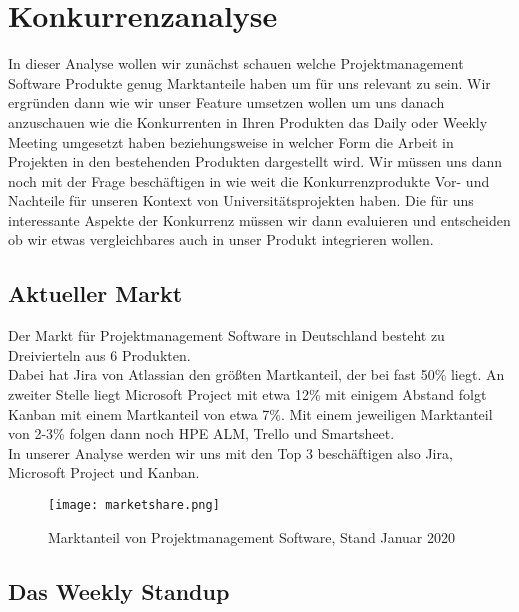 \chapter{Konkurrenzanalyse}

In dieser Analyse wollen wir zunächst schauen welche Projektmanagement Software Produkte genug Marktanteile haben um für uns relevant zu sein. Wir ergründen dann wie wir unser Feature umsetzen wollen um uns danach anzuschauen wie die Konkurrenten in Ihren Produkten das Daily oder Weekly Meeting umgesetzt haben beziehungsweise in welcher Form die Arbeit in Projekten in den bestehenden Produkten dargestellt wird. Wir müssen uns dann noch mit der Frage beschäftigen in wie weit die Konkurrenzprodukte Vor- und Nachteile für unseren Kontext von Universitätsprojekten haben. Die für uns interessante Aspekte der Konkurrenz müssen wir dann evaluieren und entscheiden ob wir etwas vergleichbares auch in unser Produkt integrieren wollen.

\section{Aktueller Markt}

Der Markt für Projektmanagement Software in Deutschland besteht zu Dreivierteln aus 6 Produkten. \\
Dabei hat Jira von Atlassian den größten Martkanteil, der bei fast 50\% liegt. An zweiter Stelle liegt Microsoft Project mit etwa 12\% mit einigem Abstand folgt Kanban mit einem Martkanteil von etwa 7\%. Mit einem jeweiligen Marktanteil von 2-3\% folgen dann noch HPE ALM, Trello und Smartsheet. \\
In unserer Analyse werden wir uns mit den Top 3 beschäftigen also Jira, Microsoft Project und Kanban. 

\begin{figure}[H]
	\centering
	\texttt{[image: marketshare.png]}
    \caption{Marktanteil von Projektmanagement Software, Stand Januar 2020\cite{statista2020}}
	\label{fig:marketshare}
\end{figure}

\section{Das Weekly Standup}

